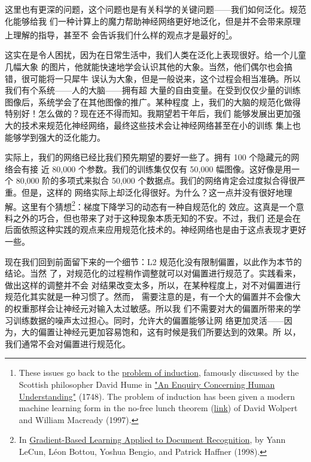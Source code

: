 这里也有更深的问题，这个问题也是有关科学的关键问题——我们如何泛化。规范化能够给我
们一种计算上的魔力帮助神经网络更好地泛化，但是并不会带来原理上理解的指导，甚至不
会告诉我们什么样的观点才是最好的\footnote{These issues go back to the
  \href{http://en.wikipedia.org/wiki/Problem_of_induction}{problem of
    induction}, famously discussed by the Scottish philosopher David Hume in
  \href{http://www.gutenberg.org/ebooks/9662}{"An Enquiry Concerning Human
    Understanding"} (1748). The problem of induction has been given a modern
  machine learning form in the no-free lunch theorem
  (\href{http://ieeexplore.ieee.org/xpl/articleDetails.jsp?tp=&arnumber=585893}{link})
  of David Wolpert and William Macready (1997).}。

这实在是令人困扰，因为在日常生活中，我们人类在泛化上表现很好。给一个儿童几幅大象
的图片，他就能快速地学会认识其他的大象。当然，他们偶尔也会搞错，很可能将一只犀牛
误认为大象，但是一般说来，这个过程会相当准确。所以我们有个系统——人的大脑——拥有超
大量的自由变量。在受到仅仅少量的训练图像后，系统学会了在其他图像的推广。某种程度
上，我们的大脑的规范化做得特别好！怎么做的？现在还不得而知。我期望若干年后，我们
能够发展出更加强大的技术来规范化神经网络，最终这些技术会让神经网络甚至在小的训练
集上也能够学到强大的泛化能力。

实际上，我们的网络已经比我们预先期望的要好一些了。拥有 100 个隐藏元的网络会有接
近 80,000 个参数。我们的训练集仅仅有 50,000 幅图像。这好像是用一个 80,000
阶的多项式来拟合 50,000 个数据点。我们的网络肯定会过度拟合得很严重。但是，这样的
网络实际上却泛化得很好。为什么？这一点并没有很好地理解。这里有个猜想\footnote{In
  \href{http://yann.lecun.com/exdb/publis/pdf/lecun-01a.pdf}{Gradient-Based
    Learning Applied to Document Recognition}, by Yann LeCun, Léon Bottou,
  Yoshua Bengio, and Patrick Haffner (1998).}：梯度下降学习的动态有一种自规范化的
效应。这真是一个意料之外的巧合，但也带来了对于这种现象本质无知的不安。不过，我们
还是会在后面依照这种实践的观点来应用规范化技术的。神经网络也是由于这点表现才更好
一些。

现在我们回到前面留下来的一个细节：L2 规范化没有限制偏置，以此作为本节的结论。当然
了，对规范化的过程稍作调整就可以对偏置进行规范了。实践看来，做出这样的调整并不会
对结果改变太多，所以，在某种程度上，对不对偏置进行规范化其实就是一种习惯了。然而，
需要注意的是，有一个大的偏置并不会像大的权重那样会让神经元对输入太过敏感。所以我
们不需要对大的偏置所带来的学习训练数据的噪声太过担心。同时，允许大的偏置能够让网
络更加灵活——因为，大的偏置让神经元更加容易饱和，这有时候是我们所要达到的效果。所
以，我们通常不会对偏置进行规范化。

